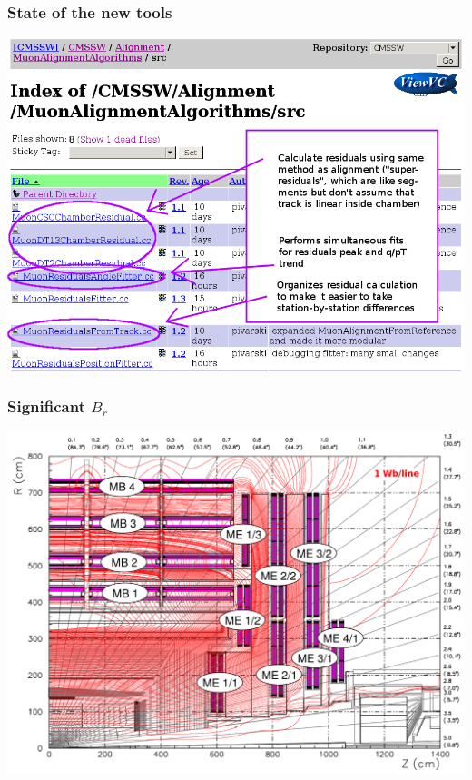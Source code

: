 \documentclass[compress]{beamer}
\begin{document}
\begin{frame}
\frametitle{State of the new tools}
\includegraphics[width=\linewidth]{cvs.png}
\end{frame}

\begin{frame}
\frametitle{Significant $B_r$}
\includegraphics[width=\linewidth]{muon_system_with_lines.png}
\end{frame}
\end{document}
